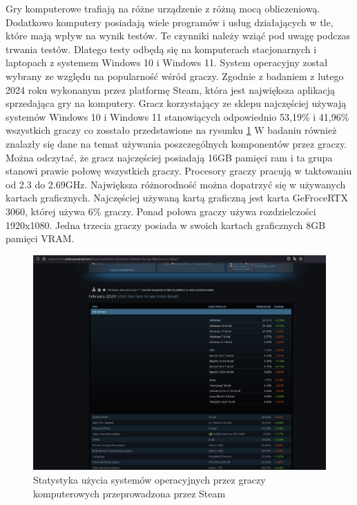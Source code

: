 \documentclass[12pt,twoside]{article}
\begin{document}
Gry komputerowe trafiają na różne urządzenie z różną mocą obliczeniową.
Dodatkowo komputery posiadają wiele programów i usług działających w tle, które
mają wpływ na wynik testów. Te czynniki należy wziąć pod uwagę podczas trwania
testów. Dlatego testy odbędą się na komputerach stacjonarnych i laptopach z
systemem Windows 10 i Windows 11. System operacyjny został wybrany ze względu na popularność
wśród graczy. Zgodnie z badaniem z lutego 2024 roku wykonanym przez platformę
Steam, która jest największa aplikacją sprzedająca gry na komputery. Gracz
korzystający ze sklepu najczęściej używają systemów Windows 10 i Windows 11
stanowiących odpowiednio 53,19\% i 41,96\% wszystkich graczy co zosstało
przedstawione na rysunku
\ref{SteamHardwareSoftwareSurvay} W badaniu również znalazły się dane na temat
używania poszczególnych komponentów przez graczy. Można odczytać, że gracz
najczęściej posiadają 16GB pamięci ram i ta grupa stanowi prawie połowę
wszystkich graczy. Procesory graczy pracują w taktowaniu od 2.3 do 2.69GHz.
Największa różnorodność można dopatrzyć się w używanych kartach graficznych.
Najczęściej używaną kartą graficzną jest karta GeFroceRTX 3060, której używa
6\% graczy. Ponad połowa graczy używa rozdzielczości 1920x1080. Jedna trzecia
graczy posiada w swoich kartach graficznych 8GB pamięci VRAM.

\begin{figure}[H]
    \centering
    \includegraphics[width=14cm]{figures/SteamHardwareSoftwareSurvay.png}
    \caption{Statystyka użycia systemów operacyjnych przez graczy komputerowych przeprowadzona przez Steam \cite{SteamSurvey}}
    \label{SteamHardwareSoftwareSurvay}
\end{figure}
\end{document}
